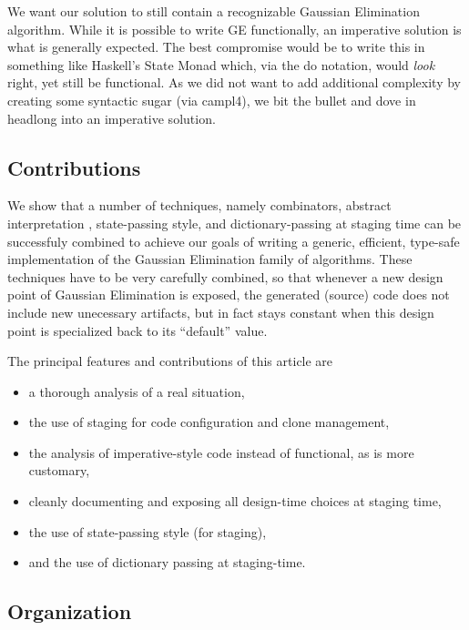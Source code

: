 \documentclass[11pt]{elsart}
\begin{document}
We want our solution to still contain a recognizable Gaussian Elimination
algorithm.  While it is possible to write GE functionally, an imperative
solution is what is generally expected.  The best compromise would be to write
this in something like Haskell's State Monad which, via the do notation,
would \emph{look} right, yet still be functional.  As we did not want to 
add additional complexity by creating some syntactic sugar (via campl4), 
we bit the bullet and dove in headlong into an imperative solution.

\subsection{Contributions}

We show that a number of techniques, 
namely combinators, abstract interpretation
\cite{conf/popl/CousotC77}, state-passing style, and 
dictionary-passing at staging
time can be successfuly combined to achieve our goals of 
writing a generic, efficient, type-safe implementation of the
Gaussian Elimination family of algorithms.  These techniques have
to be very carefully combined, so that whenever a new design point of 
Gaussian Elimination is exposed, 
the generated (source) code does not include new unecessary artifacts, but 
in fact stays
constant when this design point is specialized back to its ``default'' value.

The principal features and contributions of this article are
\begin{itemize}
    \item a thorough analysis of a real situation,
    \item the use of staging for code configuration and clone management,
    \item the analysis of imperative-style code instead of 
		functional, as is more customary,
    \item cleanly documenting and exposing all design-time choices at 
        staging time,
    \item the use of state-passing style (for staging),
    \item and the use of dictionary passing at staging-time.
\end{itemize}

\subsection{Organization}
\end{document}
